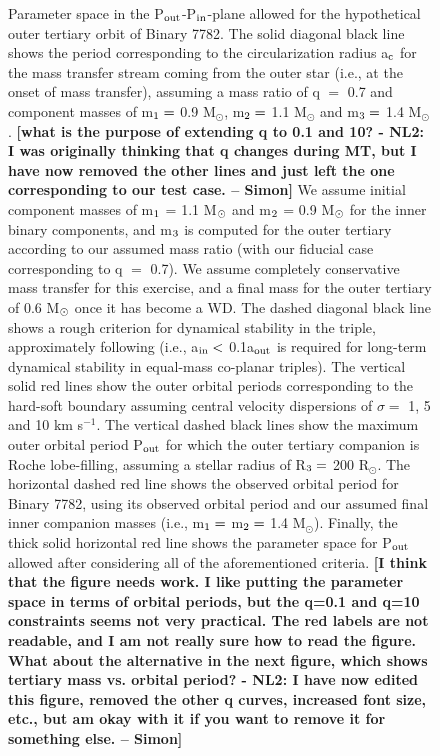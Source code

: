 \documentclass{aastex62}
\def\simon#1{{\bf {\color{red}[#1 -- Simon]}}}
\begin{document}
\begin{figure}[ht!]
\caption{Parameter space in the P$_{\rm out}$-P$_{\rm in}$-plane
  allowed for the hypothetical outer tertiary orbit of Binary 7782.
  The solid diagonal black line shows the period corresponding to the
  circularization radius a$_{\rm c}$ for the mass transfer stream
  coming from the outer star (i.e., at the onset of mass transfer), assuming a mass ratio of q $=$ 0.7 and component masses 
  of m$_{\rm 1} =$ 0.9 M$_{\odot}$, m$_{\rm 2} =$ 1.1 M$_{\odot}$ and 
  m$_{\rm 3} =$ 1.4 M$_{\odot}$. \simon{what is the purpose of extending q to 0.1 and
    10? - NL2: I was originally thinking that q changes during MT, but I have now removed the other lines and just left the one corresponding to our test case.} We assume initial component masses of m$_{\rm 1}$ = 1.1
  M$_{\rm \odot}$ and m$_{\rm 2}$ = 0.9 M$_{\rm \odot}$ for the inner
  binary components, and m$_{\rm 3}$ is computed for the outer
  tertiary according to our assumed mass ratio (with our fiducial case
  corresponding to q $=$ 0.7).  We assume completely conservative mass
  transfer for this exercise, and a final mass for the outer tertiary
  of 0.6 M$_{\rm \odot}$ once it has become a WD.  The dashed diagonal
  black line shows a rough criterion for dynamical stability in the
  triple, approximately following \citet{mardling99} (i.e., a$_{\rm
    in} <$ 0.1a$_{\rm out}$ is required for long-term dynamical
  stability in equal-mass co-planar triples).  The vertical solid red
  lines show the outer orbital periods corresponding to the hard-soft
  boundary assuming central velocity dispersions of $\sigma =$ 1, 5
  and 10 km s$^{-1}$.  The vertical dashed black lines show the
  maximum outer orbital period P$_{\rm out}$ for which the outer
  tertiary companion is Roche lobe-filling, assuming a stellar radius
  of R$_{\rm 3} =$ 200 R$_{\odot}$.  The horizontal dashed red line shows the observed
  orbital period for Binary 7782, using its observed orbital period
  and our assumed final inner companion masses (i.e., m$_{\rm 1} =$
  m$_{\rm 2} =$ 1.4 M$_{\odot}$).  Finally, the thick solid horizontal
  red line shows the parameter space for P$_{\rm out}$ allowed after
  considering all of the aforementioned criteria.  \simon{I think that
    the figure needs work. I like putting the parameter space in terms
    of orbital periods, but the q=0.1 and q=10 constraints seems
    not very practical. The red labels are not readable, and I am not
    really sure how to read the figure. What about the alternative in
    the next figure, which shows tertiary mass vs. orbital period? - NL2: I have now edited this figure, removed the other q curves, increased font size, etc., but am okay with it if you want to remove it for something else.}
\label{fig:fig2}}
\end{figure}
\end{document}
